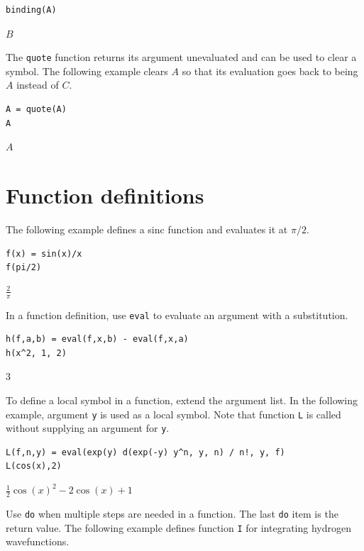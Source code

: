 \documentclass[12pt]{article}
\begin{document}
{\color{blue}
\begin{verbatim}
binding(A)
\end{verbatim}
}

$\displaystyle B$

\bigskip

The \verb$quote$ function returns its argument unevaluated
and can be used to clear a symbol.
The following example clears $A$ so that its evaluation goes back to
being $A$ instead of $C$.

{\color{blue}
\begin{verbatim}
A = quote(A)
A
\end{verbatim}
}

$\displaystyle A$

\newpage

\section{Function definitions}

The following example defines a sinc function and evaluates it at $\pi/2$.

{\color{blue}
\begin{verbatim}
f(x) = sin(x)/x
f(pi/2)
\end{verbatim}}

$\displaystyle \frac{2}{\pi}$

\bigskip
In a function definition, use \verb$eval$ to evaluate an argument with a substitution.

{\color{blue}
\begin{verbatim}
h(f,a,b) = eval(f,x,b) - eval(f,x,a)
h(x^2, 1, 2)
\end{verbatim}}

$3$

\bigskip
To define a local symbol in a function, extend the argument list.
In the following example, argument \verb$y$ is used as a local symbol.
Note that function \verb$L$ is called without supplying an argument for \verb$y$.

{\color{blue}
\begin{verbatim}
L(f,n,y) = eval(exp(y) d(exp(-y) y^n, y, n) / n!, y, f)
L(cos(x),2)
\end{verbatim}
}

$\displaystyle \tfrac{1}{2}\cos(x)^2-2\cos(x)+1$

\bigskip
Use \verb$do$ when multiple steps are needed in a function.
The last \verb$do$ item is the return value.
The following example defines function \verb$I$ for
integrating hydrogen wavefunctions.
\end{document}
